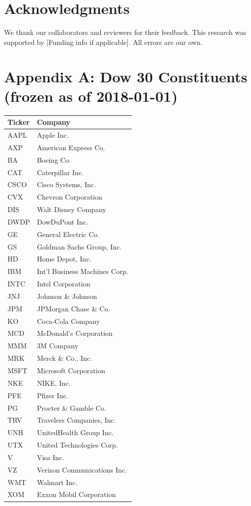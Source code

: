 \documentclass[10pt,twocolumn]{article}
\begin{document}
\section*{Acknowledgments}
We thank our collaborators and reviewers for their feedback. This research was supported by [Funding info if applicable]. All errors are our own.




\appendix
\section*{Appendix A: Dow 30 Constituents (frozen as of 2018-01-01)}
\begin{small}
\begin{tabular}{ll}
\toprule
Ticker & Company \\
\midrule
AAPL & Apple Inc. \\
AXP & American Express Co. \\
BA & Boeing Co. \\
CAT & Caterpillar Inc. \\
CSCO & Cisco Systems, Inc. \\
CVX & Chevron Corporation \\
DIS & Walt Disney Company \\
DWDP & DowDuPont Inc. \\
GE & General Electric Co. \\
GS & Goldman Sachs Group, Inc. \\
HD & Home Depot, Inc. \\
IBM & Int'l Business Machines Corp. \\
INTC & Intel Corporation \\
JNJ & Johnson \& Johnson \\
JPM & JPMorgan Chase \& Co. \\
KO & Coca-Cola Company \\
MCD & McDonald's Corporation \\
MMM & 3M Company \\
MRK & Merck \& Co., Inc. \\
MSFT & Microsoft Corporation \\
NKE & NIKE, Inc. \\
PFE & Pfizer Inc. \\
PG & Procter \& Gamble Co. \\
TRV & Travelers Companies, Inc. \\
UNH & UnitedHealth Group Inc. \\
UTX & United Technologies Corp. \\
V   & Visa Inc. \\
VZ  & Verizon Communications Inc. \\
WMT & Walmart Inc. \\
XOM & Exxon Mobil Corporation \\
\bottomrule
\end{tabular}
\end{small}
\end{document}
